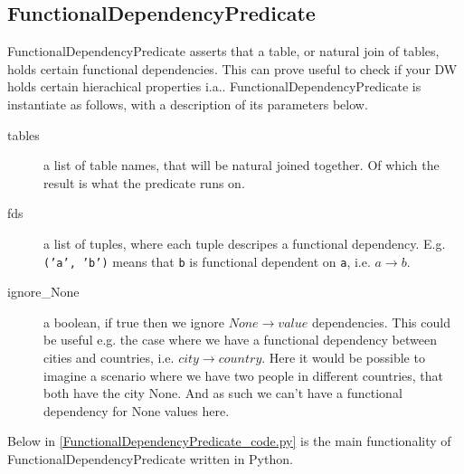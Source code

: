 \subsection{FunctionalDependencyPredicate}
FunctionalDependencyPredicate asserts that a table, or natural join of tables, holds certain functional dependencies. This can prove useful to check if your DW holds certain hierachical properties i.a.. FunctionalDependencyPredicate is instantiate as follows, with a description of its parameters below.


\begin{description}
\item [tables] a list of table names, that will be natural joined together. Of which the result is what the predicate runs on. 
\item [fds] a list of tuples, where each tuple descripes a functional dependency. E.g. \texttt{('a', 'b')} means that \texttt{b} is functional dependent on \texttt{a}, i.e. $a \rightarrow b$.
\item [ignore\_None] a boolean, if true then we ignore $None \rightarrow value$ dependencies. This could be useful e.g. the case where we have a functional dependency between cities and countries, i.e. $city \rightarrow country$. Here it would be possible to imagine a scenario where we have two people in different countries, that both have the city None. And as such we can't have a functional dependency for None values here.
  
\end{description}

Below in \cref{FunctionalDependencyPredicate_code.py} is the main functionality of FunctionalDependencyPredicate written in Python.


